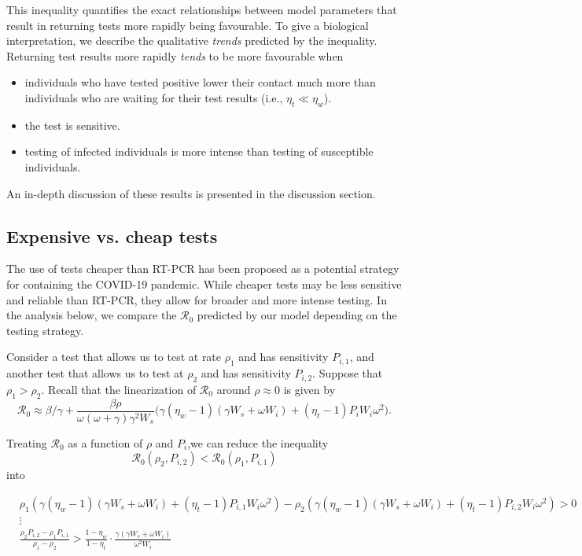 \documentclass{article}
\newcommand{\Rnum}{\mathcal{R}_0}
\theoremstyle{definition} %
\begin{document}
This inequality quantifies the exact relationships between model parameters that result in returning tests more rapidly being favourable. To give a biological interpretation, we describe the qualitative \textit{trends} predicted by the inequality. Returning test results more rapidly \textit{tends} to be more favourable when

\begin{itemize}
    \item individuals who have tested positive lower their contact much more than individuals who are waiting for their test results (i.e., $\eta_t \ll \eta_w$).
    \item the test is sensitive.
    \item testing of infected individuals is more intense than testing of susceptible individuals.
\end{itemize}
An in-depth discussion of these results is presented in the discussion section. 

\subsection{Expensive vs. cheap tests}

The use of tests cheaper than RT-PCR has been proposed as a potential strategy for containing the COVID-19 pandemic. While cheaper tests may be less sensitive and reliable than RT-PCR, they allow for broader and more intense testing. In the analysis below, we compare the $\Rnum$ predicted by our model depending on the testing strategy. 

Consider a test that allows us to test at rate $\rho_1$ and has sensitivity $P_{i,1}$, and another test that allows us to test at $\rho_2$ and has sensitivity $P_{i,2}$. Suppose that $\rho_1 > \rho_2$. Recall that the linearization of $\Rnum$ around $\rho \approx 0$ is given by $$\Rnum \approx \beta/\gamma + \frac{\beta \rho}{\omega (\omega+\gamma) \gamma^2 W_s} \Big(\gamma(\eta_w-1)(\gamma W_s+\omega W_i) + (\eta_t -1)P_iW_i \omega^2 \Big).$$


Treating $\Rnum$ as a function of $\rho$ and $P_i$,we can reduce the inequality $$\Rnum(\rho_2, P_{i,2}) < \Rnum(\rho_1, P_{i,1})$$ into 

\begin{align}\label{eq:rho1vsrho2}
    &\rho_1\left(\gamma(\eta_w-1)(\gamma W_s + \omega W_i) + (\eta_t-1)P_{i, 1}W_i\omega^2\right) - \rho_2\left(\gamma(\eta_w-1)(\gamma W_s + \omega W_i) + (\eta_t-1)P_{i, 2}W_i\omega^2\right) > 0 \nonumber \\
    &\vdots \nonumber \\
    &\frac{\rho_2P_{i, 2}-\rho_1P_{i, 1} }{\rho_1-\rho_2} > \frac{1-\eta_w}{1-\eta_t}\cdot \frac{\gamma(\gamma W_s + \omega W_i)}{\omega^2 W_i}
\end{align}
\end{document}
